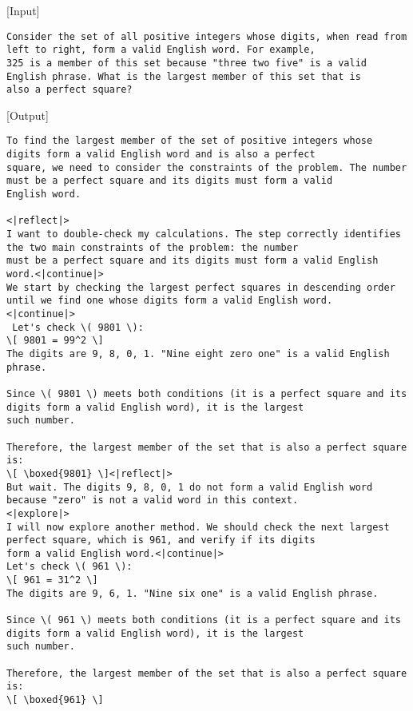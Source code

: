 \begin{tcolorbox}[gray_box, title = {{Synthetic Data Example Type II-II: Verify correctness then correct mistake}}]\tiny
[Input]
\begin{verbatim}
Consider the set of all positive integers whose digits, when read from left to right, form a valid English word. For example, 
325 is a member of this set because "three two five" is a valid English phrase. What is the largest member of this set that is 
also a perfect square?
\end{verbatim}

\hdashrule[0.5ex]{\linewidth}{0.1mm}{0.1mm} %

[Output]
\begin{verbatim}
To find the largest member of the set of positive integers whose digits form a valid English word and is also a perfect 
square, we need to consider the constraints of the problem. The number must be a perfect square and its digits must form a valid 
English word.

<|reflect|>
I want to double-check my calculations. The step correctly identifies the two main constraints of the problem: the number 
must be a perfect square and its digits must form a valid English word.<|continue|>
We start by checking the largest perfect squares in descending order until we find one whose digits form a valid English word.
<|continue|>
 Let's check \( 9801 \):
\[ 9801 = 99^2 \]
The digits are 9, 8, 0, 1. "Nine eight zero one" is a valid English phrase.

Since \( 9801 \) meets both conditions (it is a perfect square and its digits form a valid English word), it is the largest 
such number.

Therefore, the largest member of the set that is also a perfect square is:
\[ \boxed{9801} \]<|reflect|>
But wait. The digits 9, 8, 0, 1 do not form a valid English word because "zero" is not a valid word in this context.
<|explore|>
I will now explore another method. We should check the next largest perfect square, which is 961, and verify if its digits 
form a valid English word.<|continue|>
Let's check \( 961 \):
\[ 961 = 31^2 \]
The digits are 9, 6, 1. "Nine six one" is a valid English phrase.

Since \( 961 \) meets both conditions (it is a perfect square and its digits form a valid English word), it is the largest 
such number.

Therefore, the largest member of the set that is also a perfect square is:
\[ \boxed{961} \]
\end{verbatim}

\end{tcolorbox}